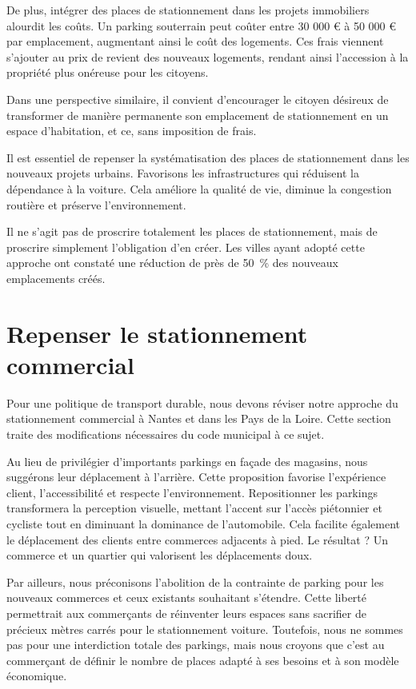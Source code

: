De plus, intégrer des places de stationnement dans les projets
immobiliers alourdit les coûts. Un parking souterrain peut coûter
entre 30 000 € à 50 000 € par emplacement, augmentant ainsi le coût
des logements. Ces frais viennent s'ajouter au prix de revient des
nouveaux logements, rendant ainsi l'accession à la propriété plus
onéreuse pour les citoyens.

Dans une perspective similaire, il convient d'encourager le citoyen
désireux de transformer de manière permanente son emplacement de
stationnement en un espace d'habitation, et ce, sans imposition de
frais.

Il est essentiel de repenser la systématisation des places de
stationnement dans les nouveaux projets urbains. Favorisons les
infrastructures qui réduisent la dépendance à la voiture. Cela
améliore la qualité de vie, diminue la congestion routière et préserve
l'environnement.

Il ne s'agit pas de proscrire totalement les places de stationnement,
mais de proscrire simplement l'obligation d'en créer. Les villes ayant
adopté cette approche ont constaté une réduction de près de 50~\% des
nouveaux emplacements créés.



\section{Repenser le stationnement commercial}

Pour une politique de transport durable, nous devons réviser notre
approche du stationnement commercial à Nantes et dans les Pays de la
Loire. Cette section traite des modifications nécessaires du code
municipal à ce sujet.

Au lieu de privilégier d'importants parkings en façade des magasins,
nous suggérons leur déplacement à l'arrière. Cette proposition
favorise l’expérience client, l'accessibilité et respecte
l'environnement. Repositionner les parkings transformera la perception
visuelle, mettant l'accent sur l'accès piétonnier et cycliste tout en
diminuant la dominance de l'automobile. Cela facilite également le
déplacement des clients entre commerces adjacents à pied. Le résultat
? Un commerce et un quartier qui valorisent les déplacements doux.

Par ailleurs, nous préconisons l'abolition de la contrainte de parking
pour les nouveaux commerces et ceux existants souhaitant
s'étendre. Cette liberté permettrait aux commerçants de réinventer
leurs espaces sans sacrifier de précieux mètres carrés pour le
stationnement voiture. Toutefois, nous ne sommes pas pour une
interdiction totale des parkings, mais nous croyons que c'est au
commerçant de définir le nombre de places adapté à ses besoins et à
son modèle économique.


